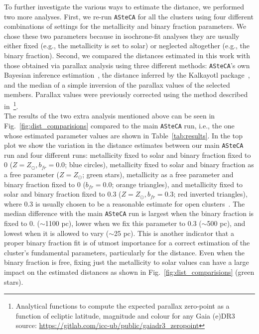 \documentclass[draft]{aa}
\begin{document}
  To further investigate the various ways to estimate the distance, we performed
  two more analyses. First, we re-run \texttt{ASteCA} for all the
  clusters using four different combinations of settings for the metallicity and
  binary fraction parameters. We chose these two parameters because in
  isochrone-fit analyses they are usually either fixed (e.g., the metallicity is
  set to solar) or neglected altogether (e.g., the binary fraction).
  Second, we compared the distances estimated in this work with those obtained
  via parallax analysis using three different methods: \texttt{ASteCA}'s own
  Bayesian inference estimation~\citep[described in][]{Perren_2020}, the
  distance inferred by the Kalkayotl package~\citep{Kalkayotl}, and the median
  of a simple inversion of the parallax values of the selected members.
  Parallax values were previously corrected using the method described
  in~\cite{Lindegren_2021}\footnote{ Analytical functions to compute the
  expected parallax zero-point as a function of ecliptic latitude, magnitude and
  colour for any Gaia (e)DR3
  source: \url{https://gitlab.com/icc-ub/public/gaiadr3_zeropoint}}.\\

  The results of the two extra analysis mentioned above can be seen in
  Fig.~\ref{fig:dist_comparisions} compared to the main \texttt{ASteCA} run,
  i.e., the one whose estimated parameter values are shown in
  Table~\ref{tab:results}.
  In the top plot we show the variation in the distance estimates between our
  main \texttt{ASteCA} run and four different runs: metallicity fixed to solar
  and binary fraction fixed to 0 ($Z=Z_{\odot},b_{fr}=0.0$; blue circles),
  metallicity fixed to solar and binary fraction as a free parameter
  ($Z=Z_{\odot}$; green stars), metallicity as a free parameter and binary
  fraction fixed to 0 ($b_{fr}=0.0$; orange triangles), and metallicity fixed to
  solar and binary fraction fixed to 0.3 ($Z=Z_{\odot},b_{fr}=0.3$; red
  inverted triangles), where 0.3 is usually chosen to be a reasonable estimate
  for open clusters~\citep{Sollima_2010}. The median difference with the main
  \texttt{ASteCA} run is largest when the binary fraction is fixed to 0. 
  ($\sim$1100 pc), lower when we fix this parameter to 0.3 ($\sim$500 pc),
  and lowest when it is allowed to vary ($\sim$25 pc). This is another indicator
  that a proper binary fraction fit is of utmost importance for a correct
  estimation of the cluster's fundamental parameters, particularly for the
  distance. Even when the binary fraction is free, fixing just the metallicity
  to solar values can have a large impact on the estimated distances as shown in
  Fig.~\ref{fig:dist_comparisions} (green stars).
\end{document}
